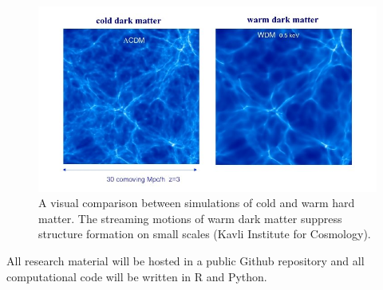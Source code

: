 \documentclass[12pt]{article}
\begin{document}
\begin{figure}[!htb]
	\centering
    \includegraphics[width=0.5\linewidth]{simulations.jpg}
    \caption{A visual comparison between simulations of cold and warm hard matter. The streaming motions of warm dark matter suppress structure formation on small scales (Kavli Institute for Cosmology).}
\end{figure}

All research material will be hosted in a public Github repository and all computational code will be written in R and Python. 
\end{document}
